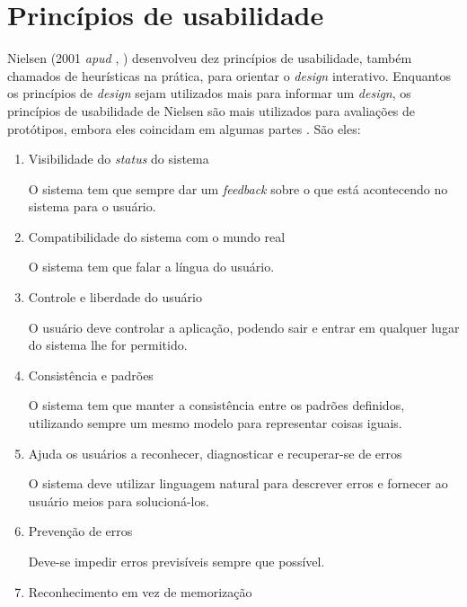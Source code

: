   \section{Princípios de usabilidade}
    
    Nielsen (2001 \textit{apud} \citeauthor{preece}, \citeyear{preece}) desenvolveu dez princípios de usabilidade, também chamados de
    heurísticas na prática, para orientar o \textit{design} interativo. Enquantos os princípios de \textit{design} sejam utilizados
    mais para informar um \textit{design}, os princípios de usabilidade de Nielsen são mais utilizados para avaliações de
    protótipos, embora eles coincidam em algumas partes \cite{preece}. São eles:
    
    \begin{enumerate}
     \item Visibilidade do \textit{status} do sistema
  
	\subitem O sistema tem que sempre dar um \textit{feedback} sobre o que está acontecendo no sistema para o usuário.
     
     \item Compatibilidade do sistema com o mundo real
  
	\subitem O sistema tem que falar a língua do usuário.
	
     \item Controle e liberdade do usuário
     
	\subitem O usuário deve controlar a aplicação, podendo sair e entrar em qualquer lugar do sistema lhe for permitido.
     
     \item Consistência e padrões
      
	\subitem O sistema tem que manter a consistência entre os padrões definidos, utilizando sempre um mesmo modelo para representar
	coisas iguais.
	
     \item Ajuda os usuários a reconhecer, diagnosticar e recuperar-se de erros
	
	\subitem O sistema deve utilizar linguagem natural para descrever erros e fornecer ao usuário meios para solucioná-los.
	
     \item Prevenção de erros
	
	\subitem Deve-se impedir erros previsíveis sempre que possível.
	
     \item Reconhecimento em vez de memorização
	

\end{enumerate}
